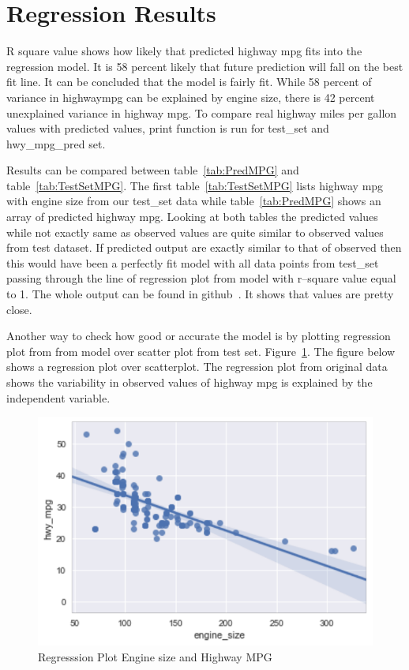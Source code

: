   
\section{Regression Results}

 R square value shows how likely that predicted highway mpg fits into the
 regression model. It is 58 percent likely that future prediction will fall
 on the best fit line. It can be concluded that the model is fairly fit. While 
 58 percent of variance in highwaympg can be explained by engine size,
 there is 42 percent unexplained
 variance in highway mpg. To compare real highway miles per gallon values with 
 predicted values, print function is
 run for test\_set and hwy\_mpg\_pred set.
 
 Results can be compared between table~\ref{tab:PredMPG} 
 and table~\ref{tab:TestSetMPG}. 
 The first table~\ref{tab:TestSetMPG} lists highway mpg with engine size from our
 test\_set data while table~\ref{tab:PredMPG} shows an array of predicted highway mpg. 
 Looking at both tables the predicted values while not exactly same as observed 
 values are quite similar to observed values from test dataset. If predicted
 output are exactly similar to that of observed then this would have been a 
 perfectly fit model with all data points from test\_set passing through the
 line of regression plot from model with r--square value equal to 1.
 The whole output can be found in github~\cite{hid-sp18-415-analysis}.
 It shows that values are pretty close.
 
 Another way to check how good or accurate the model is by plotting regression 
 plot from from model over scatter plot from test set. 
 Figure~\ref{fig:regplt}. The figure below shows a regression plot
 over scatterplot. The regression plot from original data shows the variability
 in observed values of highway mpg is explained by the independent variable.
 
 \begin{figure}[!h]
  \includegraphics[scale=1.0]{images/reg_plot.pdf}
  \caption{Regresssion Plot Engine size and Highway MPG}
\label{fig:regplt}
\end{figure}
 
